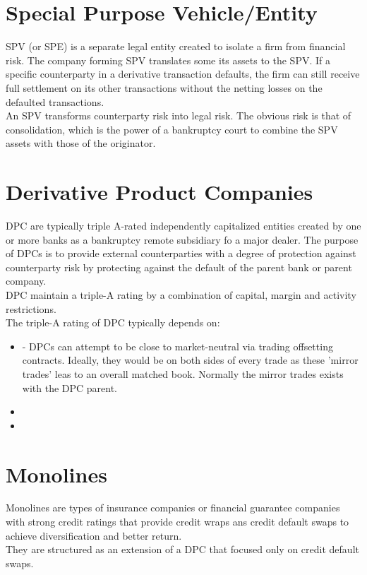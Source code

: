 \section{Special Purpose Vehicle/Entity}
SPV (or SPE) is a separate legal entity created to isolate a firm from financial risk. The company forming SPV translates some its assets to the SPV. If a specific counterparty in a derivative transaction defaults, the firm can still receive full settlement on its other transactions without the netting losses on the defaulted transactions.\\
An SPV transforms counterparty risk into legal risk. The obvious risk is that of consolidation, which is the power of a bankruptcy court to combine the SPV assets with those of the originator.

\section{Derivative Product Companies}
DPC are typically triple A-rated independently capitalized entities created by one or more banks as a bankruptcy remote subsidiary fo a major dealer. The purpose of DPCs is to provide external counterparties with a degree of protection against counterparty risk by protecting against the default of the parent bank or parent company.\\
DPC maintain a triple-A rating by a combination of capital, margin and activity restrictions.\\
The triple-A rating of DPC typically depends on:
\begin{itemize}
	\item {} - DPCs can attempt to be close to market-neutral via trading offsetting contracts. Ideally, they would be on both sides of every trade as these 'mirror trades' leas to an overall matched book. Normally the mirror trades exists with the DPC parent.
	\item {}
	\item {}
\end{itemize}

\section{Monolines}
Monolines are types of insurance companies or financial guarantee companies with strong credit ratings that provide credit wraps ans credit default swaps to achieve diversification and better return.\\
They are structured as an extension of a DPC that focused only on credit default swaps.


